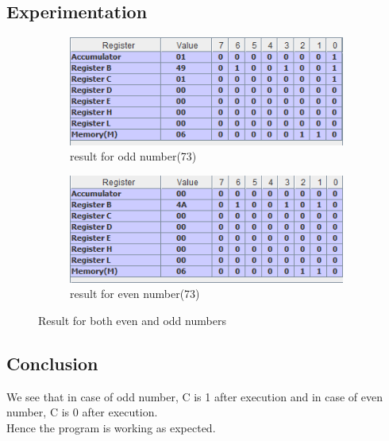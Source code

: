 \documentclass[a4paper]{article} %
\begin{document}
    \subsection{Experimentation}
        \begin{figure}[h!]
            \centering
            \begin{subfigure}[b]{0.49\linewidth}
                \centering
                \includegraphics[width=\linewidth]{Assignment 2/2_isodd/odd73.png}
                \caption{result for odd number(73)}
                \label{fg4a}
            \end{subfigure}
            \begin{subfigure}[b]{0.49\linewidth}
                \centering
                \includegraphics[width=\linewidth]{Assignment 2/2_isodd/even74.png}
                \caption{result for even number(73)}
                \label{fg4b}
            \end{subfigure}
            \caption{Result for both even and odd numbers}
            \label{fg4}
        \end{figure}
    \subsection{Conclusion}
        We see that in case of odd number, C is 1 after execution and in case of even number, C is 0 after execution.\\
        Hence the program is working as expected.
\newpage
\end{document}
